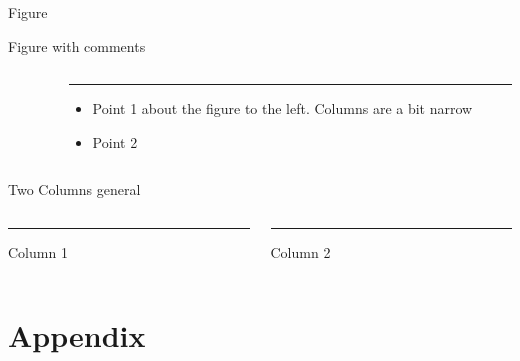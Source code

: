 \documentclass{beamer}
\begin{document}
\begin{frame}{Figure}
    \begin{center}
    \end{center}
\end{frame}

\begin{frame}{Figure with comments}
    \begin{columns}[T] %
    \begin{column}{.62\textwidth}
    \end{column}%

    \begin{column}{.38\textwidth}
        {\color{buff-gold}\rule{\linewidth}{4pt}}
        
        \begin{itemize}[leftmargin=0cm]
            \item Point 1 about the figure to the left. Columns are a bit narrow
            \item Point 2
        \end{itemize}
    \end{column}%
    \end{columns}
\end{frame}



\begin{frame}{Two Columns general}
    \begin{columns}[T] %
    \begin{column}{.50\textwidth}
        {\color{buff-gold}\rule{\linewidth}{4pt}}
        Column 1
    \end{column}
    
    \hfill
    
    \begin{column}{.50\textwidth}
        {\color{buff-gold}\rule{\linewidth}{4pt}}
        Column 2
    \end{column}
    \end{columns}
\end{frame}


\section{Appendix}
\end{document}
